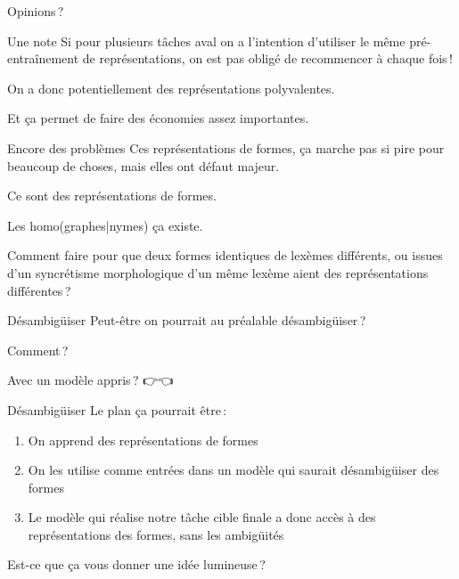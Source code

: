 \documentclass[
	xcolor={svgnames},
	aspectratio=169,
	french,
]{beamer}
\begin{document}
\begin{frame}[standout]
	Opinions ?
\end{frame}

\begin{frame}{Une note}
	Si pour plusieurs tâches aval on a l'intention d'utiliser le même pré-entraînement de
	représentations, on est pas obligé de recommencer à chaque fois !

	\pause

	On a donc potentiellement des représentations \alert{polyvalentes}.

	\pause

	Et ça permet de faire des économies assez importantes.
\end{frame}

\begin{frame}{Encore des problèmes}
	Ces représentations de formes, ça marche  pas si pire pour beaucoup de
	choses, mais elles ont défaut majeur.

	\pause

	Ce sont des représentations de \alert{formes}.

	\pause

	Les homo(graphes|nymes) ça existe.

	\pause

	Comment faire pour que deux formes identiques de lexèmes différents, ou issues d'un syncrétisme
	morphologique d'un même lexème aient des représentations différentes ?
\end{frame}

\begin{frame}{Désambigüiser}
	Peut-être on pourrait au préalable désambigüiser ?

	\pause

	Comment ?

	\pause

	{\footnotesize Avec un modèle appris ? 👉👈}
\end{frame}

\begin{frame}{Désambigüiser}
	Le plan ça pourrait être :

	\begin{enumerate}[<+->]
		\item On apprend des représentations de formes
		\item On les utilise comme entrées dans un modèle qui saurait désambigüiser des formes
		\item Le modèle qui réalise notre tâche cible finale a donc accès à des représentations des
		      formes, sans les ambigüités
	\end{enumerate}

	\pause

	Est-ce que ça vous donner une idée lumineuse ?
\end{frame}
\end{document}
